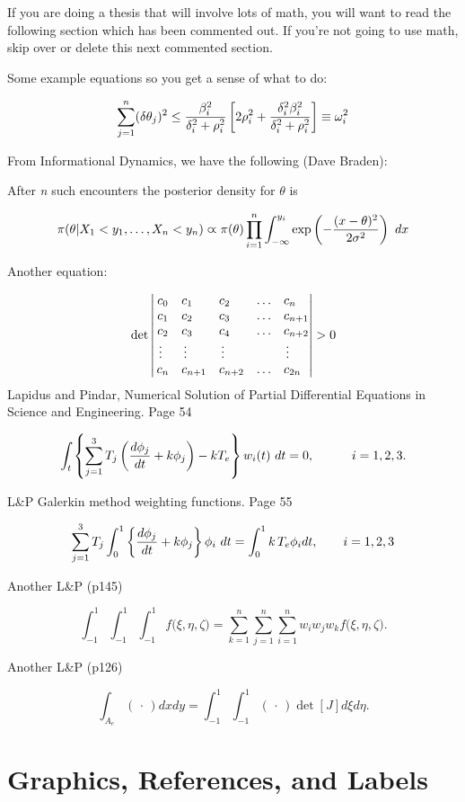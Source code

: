 \documentclass[12pt,oneside]{tisemthesis}
\begin{document}
If you are doing a thesis that will involve lots of math, you will want to read the following section which has been commented out.
If you're not going to use math, skip over or delete this next commented section.

Some example equations so you get a sense of what to do:

\[\sum_{j=1}^n (\delta\theta_j)^2 \leq {{\beta_i^2}\over{\delta_i^2 + \rho_i^2}}
\left[ 2\rho_i^2 + {\delta_i^2\beta_i^2\over{\delta_i^2 + \rho_i^2}} \right] \equiv \omega_i^2
\]

From Informational Dynamics, we have the following (Dave Braden):

After \emph{n} such encounters the posterior density for \(\theta\) is

\[
\pi(\theta|X_1< y_1,\dots,X_n<y_n) \varpropto \pi(\theta) \prod_{i=1}^n\int_{-\infty}^{y_i}
   \exp\left(-{(x-\theta)^2\over{2\sigma^2}}\right)\ dx
\]

Another equation:

\[\det\left|\,\begin{matrix}%
c_0&c_1\hfill&c_2\hfill&\ldots&c_n\hfill\cr
c_1&c_2\hfill&c_3\hfill&\ldots&c_{n+1}\hfill\cr
c_2&c_3\hfill&c_4\hfill&\ldots&c_{n+2}\hfill\cr
\,\vdots\hfill&\,\vdots\hfill&
  \,\vdots\hfill&&\,\vdots\hfill\cr
c_n&c_{n+1}\hfill&c_{n+2}\hfill&\ldots&c_{2n}\hfill\cr
\end{matrix}\right|>0\]
Lapidus and Pindar, Numerical Solution of Partial Differential Equations in Science and
Engineering. Page 54

\[
\int_t\left\{\sum_{j=1}^3 T_j \left({d\phi_j\over dt}+k\phi_j\right)-kT_e\right\}w_i(t)\ dt=0,
   \qquad\quad i=1,2,3.
\]

L\&P Galerkin method weighting functions. Page 55

\[
\sum_{j=1}^3 T_j\int_0^1\left\{{d\phi_j\over dt} + k\phi_j\right\} \phi_i\ dt
   = \int_{0}^1k\,T_e\phi_idt, \qquad i=1,2,3 \]

Another L\&P (p145)

\[
\int_{-1}^1\!\int_{-1}^1\!\int_{-1}^1 f\big(\xi,\eta,\zeta\big)
   = \sum_{k=1}^n\sum_{j=1}^n\sum_{i=1}^n w_i w_j w_k f\big( \xi,\eta,\zeta\big).
\]

Another L\&P (p126)

\[
\int_{A_e} (\,\cdot\,) dx dy = \int_{-1}^1\!\int_{-1}^1 (\,\cdot\,) \det[J] d\xi d\eta.
\]

\hypertarget{ref-labels}{%
\chapter{Graphics, References, and Labels}\label{ref-labels}}
\end{document}
